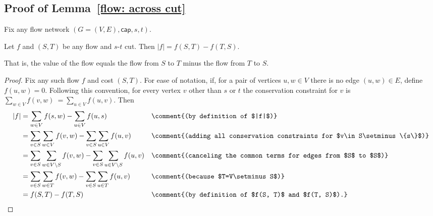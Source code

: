 

\subsection{Proof of Lemma~\ref{flow: across cut}}

Fix any flow network $(G=(V,E), \textsf{cap}, s, t)$.

\setcounter{lemma}{0}
\begin{restatement}
\begin{lemma}
  Let $f$ and $(S, T)$ be any flow and $s$-$t$ cut.
  Then \(|f| = f(S, T) - f(T, S)\).

  That is, the value of the flow equals
  the flow from $S$ to $T$ minus the flow from $T$ to $S$.
\end{lemma}
\end{restatement}

\begin{proof} %
  Fix any such flow $f$ and cost $(S, T)$.
  For ease of notation,
  if, for a pair of vertices $u, w\in V$
  there is no edge $(u, w)\in E$,
  define $f(u, w) = 0$.
  Following this convention,
  for every vertex $v$ other than $s$ or $t$
  the conservation constraint for $v$ is
  \(
    \sum_{w\in V} f(v, w)
    ~= \sum_{u\in V} f(u, v).
  \)
  Then
  \begin{align*}
    |f| & {} = \sum_{w\in V} f(s, w) - \sum_{u\in V} f(u, s) &
    & \comment{(by definition of $|f|$)}
    \\
        & {} = \sum_{v\in S}  \sum_{w\in V} f(v, w)  - \sum_{v\in S}  \sum_{u\in V} f(u, v) &
    & \comment{(adding all conservation constraints for $v\in S\setminus \{s\}$)}
    \\
        & {} = \sum_{v\in S} \sum_{w\in V\setminus S} f(v, w) - \sum_{v\in S} \sum_{u\in V\setminus S} f(u, v) &
    & \comment{(canceling the common terms for edges from $S$ to $S$)}
    \\
        & {} = \sum_{v\in S} \sum_{w\in T} f(v, w)  - \sum_{v\in S} \sum_{u\in T} f(u, v) &
    & \comment{(because $T=V\setminus S$)}
    \\
        & {} = f(S, T) - f(T, S) &
    & \comment{(by definition of $f(S, T)$ and $f(T, S)$).}
  \end{align*}
\end{proof}

